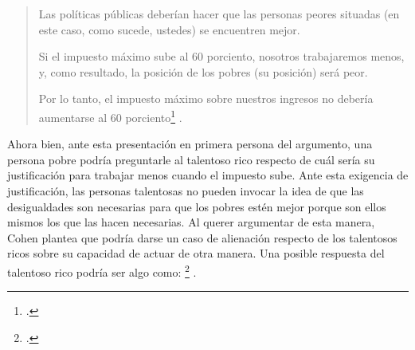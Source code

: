 \vspace{3mm}
\begin{quote}
    Las políticas públicas deberían hacer que las personas peores situadas (en este caso, como sucede, ustedes) se encuentren mejor.
        
    Si el impuesto máximo sube al 60 porciento, nosotros trabajaremos menos, y, como resultado, la posición de los pobres (su posición) será peor.
         
    Por lo tanto, el impuesto máximo sobre nuestros ingresos no debería aumentarse al 60 porciento\footnote{ \citep[p. 59]{Cohen_2008}.} \citep[p. 59]{Cohen_2008}.
    
\end{quote}
\vspace{3mm}

Ahora bien, ante esta presentación en primera persona del argumento, una persona pobre podría preguntarle al talentoso rico respecto de cuál sería su justificación para trabajar menos cuando el impuesto sube. Ante esta exigencia de justificación, las personas talentosas no pueden invocar la idea de que las desigualdades son necesarias para que los pobres estén mejor porque son ellos mismos los que las hacen necesarias. Al querer argumentar de esta manera, Cohen plantea que podría darse un caso de alienación respecto de los talentosos ricos sobre su capacidad de actuar de otra manera. Una posible respuesta del talentoso rico podría ser algo como: \footnote{ \citep[p. 60]{Cohen_2008}.} \citep[p. 60]{Cohen_2008}.

